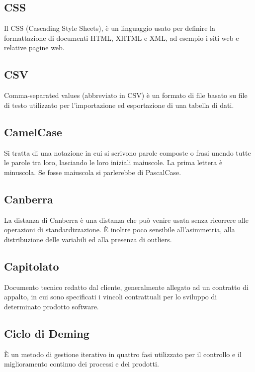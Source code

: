 \documentclass[../glossario.tex]{subfiles}
\begin{document}
\subsection*{CSS}
{}
Il CSS (Cascading Style Sheets), è un linguaggio usato per definire la formattazione di documenti HTML, XHTML e XML, ad esempio i siti web e relative pagine web.

\subsection*{CSV}
{}
Comma-separated values (abbreviato in CSV) è un formato di file basato su file di testo utilizzato per l'importazione ed esportazione di una tabella di dati.

\subsection*{CamelCase}
{}
Si tratta di una notazione in cui si scrivono parole composte o frasi unendo tutte le parole tra loro, lasciando le loro iniziali maiuscole. La prima lettera è minuscola. Se fosse maiuscola si parlerebbe di PascalCase.

\subsection*{Canberra}
{}
La distanza di Canberra è una distanza che può venire usata senza ricorrere alle operazioni di standardizzazione. È inoltre poco sensibile all'asimmetria, alla distribuzione delle variabili ed alla presenza di outliers.

\subsection*{Capitolato}
{}
Documento tecnico redatto dal cliente, generalmente allegato ad un contratto di appalto, in cui sono specificati i vincoli contrattuali per lo sviluppo di determinato prodotto software.


\subsection*{Ciclo di Deming}
{}
È un metodo di gestione iterativo in quattro fasi utilizzato per il controllo e il miglioramento continuo dei processi e dei prodotti.
\end{document}
